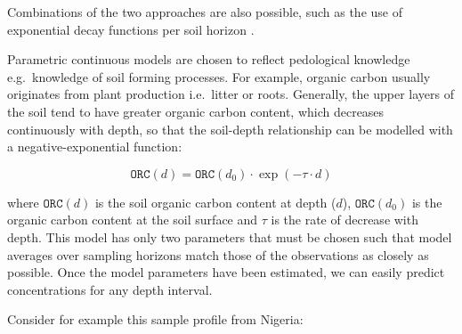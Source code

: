 \documentclass[11pt]{krantz}
\theoremstyle{definition}
\theoremstyle{definition}
\theoremstyle{definition}
\theoremstyle{remark}
\begin{document}
Combinations of the two approaches are also possible, such as the use of
exponential decay functions per soil horizon \citep{Kempen2011Geoderma}.

Parametric continuous models are chosen to reflect pedological knowledge
e.g.~knowledge of soil forming processes. For example, organic carbon
usually originates from plant production i.e.~litter or roots.
Generally, the upper layers of the soil tend to have greater organic
carbon content, which decreases continuously with depth, so that the
soil-depth relationship can be modelled with a negative-exponential
function:

\begin{equation}
{\texttt{ORC}} (d) = {\texttt{ORC}} (d_0) \cdot \exp(-\tau \cdot d)
\label{eq:SOMdepth}
\end{equation}

where \(\texttt{ORC}(d)\) is the soil organic carbon content at depth
(\(d\)), \({\texttt{ORC}} (d_0)\) is the organic carbon content at the
soil surface and \(\tau\) is the rate of decrease with depth. This model
has only two parameters that must be chosen such that model averages
over sampling horizons match those of the observations as closely as
possible. Once the model parameters have been estimated, we can easily
predict concentrations for any depth interval.

Consider for example this sample profile from Nigeria:
\end{document}
